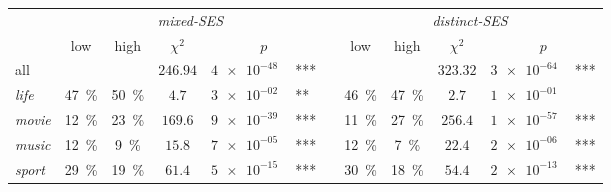 \begin{tabular}{lcccr@{\hskip0pt}llcccr@{\hskip0pt}l}\toprule & \multicolumn{5}{c}{\textit{mixed-SES}} && \multicolumn{5}{c}{\textit{distinct-SES}} \\ & low & high & $\chi^2$ & \multicolumn{2}{c}{$p$} && low & high & $\chi^2$ & \multicolumn{2}{c}{$p$} \\\toprule
all & & & $246.94$ & $\SI{4e-48}{}$ & *** && && $323.32$ & $\SI{3e-64}{}$ & *** \\
\textit{life} & \SI{47}{\percent} & \SI{50}{\percent} & $4.7$ & $\SI{3e-02}{}$ & ** && \SI{46}{\percent} & \SI{47}{\percent} & $2.7$ & $\SI{1e-01}{}$ &  \\
\textit{movie} & \SI{12}{\percent} & \SI{23}{\percent} & $169.6$ & $\SI{9e-39}{}$ & *** && \SI{11}{\percent} & \SI{27}{\percent} & $256.4$ & $\SI{1e-57}{}$ & *** \\
\textit{music} & \SI{12}{\percent} & \SI{9}{\percent} & $15.8$ & $\SI{7e-05}{}$ & *** && \SI{12}{\percent} & \SI{7}{\percent} & $22.4$ & $\SI{2e-06}{}$ & *** \\
\textit{sport} & \SI{29}{\percent} & \SI{19}{\percent} & $61.4$ & $\SI{5e-15}{}$ & *** && \SI{30}{\percent} & \SI{18}{\percent} & $54.4$ & $\SI{2e-13}{}$ & *** \\
\bottomrule\end{tabular}
